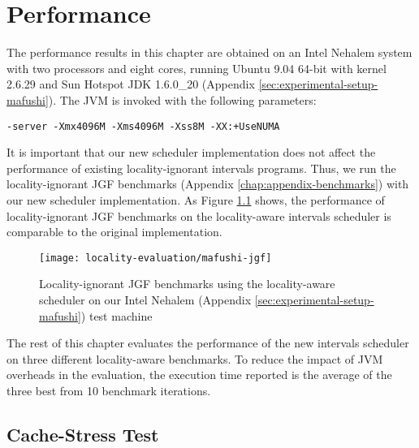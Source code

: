 
\chapter{Performance}
\label{chap:locality-performance}

The performance results in this chapter are obtained on an Intel
Nehalem system with two processors and eight cores, running Ubuntu
9.04 64-bit with kernel 2.6.29 and Sun Hotspot JDK 1.6.0\_20 (Appendix
\ref{sec:experimental-setup-mafushi}). The JVM is invoked with the
following parameters:

\begin{lstlisting}[style=Listing]
  -server -Xmx4096M -Xms4096M -Xss8M -XX:+UseNUMA
\end{lstlisting}

It is important that our new scheduler implementation does not affect
the performance of existing locality-ignorant intervals
programs. Thus, we run the locality-ignorant JGF benchmarks (Appendix
\ref{chap:appendix-benchmarks}) with our new scheduler
implementation. As Figure \ref{fig:locality-evaluation-jgf} shows, the
performance of locality-ignorant JGF benchmarks on the locality-aware
intervals scheduler is comparable to the original implementation.

\begin{figure}[!ht]
  \centering
  \texttt{[image: locality-evaluation/mafushi-jgf]}
  \caption[Locality-ignorant JGF benchmarks running on locality-aware
  scheduler]{Locality-ignorant JGF benchmarks using the locality-aware
    scheduler on our Intel Nehalem (Appendix
    \ref{sec:experimental-setup-mafushi}) test machine}
  \label{fig:locality-evaluation-jgf}
\end{figure}

The rest of this chapter evaluates the performance of the new
intervals scheduler on three different locality-aware benchmarks. To
reduce the impact of JVM overheads in the evaluation, the execution
time reported is the average of the three best from 10 benchmark
iterations.

\section{Cache-Stress Test}
\label{sec:locality-performance-cache-stress-test}

